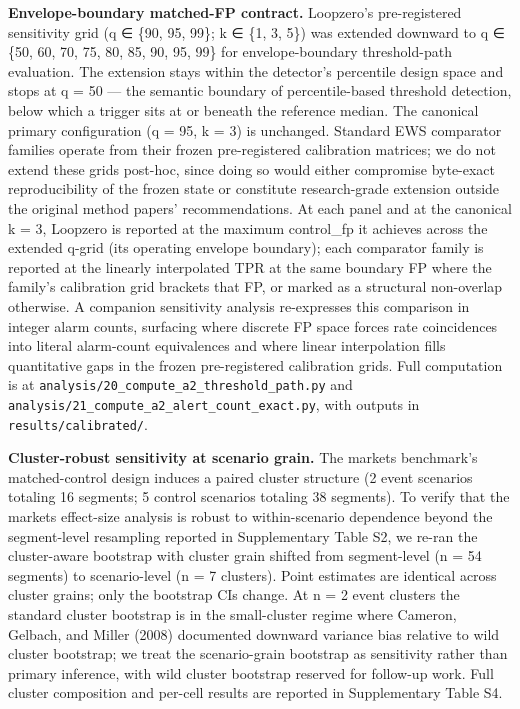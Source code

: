 \documentclass[
  11pt,
]{article}
\begin{document}
\textbf{Envelope-boundary matched-FP contract.} Loopzero's
pre-registered sensitivity grid (q ∈ \{90, 95, 99\}; k ∈ \{1, 3, 5\})
was extended downward to q ∈ \{50, 60, 70, 75, 80, 85, 90, 95, 99\} for
envelope-boundary threshold-path evaluation. The extension stays within
the detector's percentile design space and stops at q = 50 --- the
semantic boundary of percentile-based threshold detection, below which a
trigger sits at or beneath the reference median. The canonical primary
configuration (q = 95, k = 3) is unchanged. Standard EWS comparator
families operate from their frozen pre-registered calibration matrices;
we do not extend these grids post-hoc, since doing so would either
compromise byte-exact reproducibility of the frozen state or constitute
research-grade extension outside the original method papers'
recommendations. At each panel and at the canonical k = 3, Loopzero is
reported at the maximum control\_fp it achieves across the extended
q-grid (its operating envelope boundary); each comparator family is
reported at the linearly interpolated TPR at the same boundary FP where
the family's calibration grid brackets that FP, or marked as a
structural non-overlap otherwise. A companion sensitivity analysis
re-expresses this comparison in integer alarm counts, surfacing where
discrete FP space forces rate coincidences into literal alarm-count
equivalences and where linear interpolation fills quantitative gaps in
the frozen pre-registered calibration grids. Full computation is at
\texttt{analysis/20\_compute\_a2\_threshold\_path.py} and
\texttt{analysis/21\_compute\_a2\_alert\_count\_exact.py}, with outputs
in \texttt{results/calibrated/}.

\textbf{Cluster-robust sensitivity at scenario grain.} The markets
benchmark's matched-control design induces a paired cluster structure (2
event scenarios totaling 16 segments; 5 control scenarios totaling 38
segments). To verify that the markets effect-size analysis is robust to
within-scenario dependence beyond the segment-level resampling reported
in Supplementary Table S2, we re-ran the cluster-aware bootstrap with
cluster grain shifted from segment-level (n = 54 segments) to
scenario-level (n = 7 clusters). Point estimates are identical across
cluster grains; only the bootstrap CIs change. At n = 2 event clusters
the standard cluster bootstrap is in the small-cluster regime where
Cameron, Gelbach, and Miller (2008) documented downward variance bias
relative to wild cluster bootstrap; we treat the scenario-grain
bootstrap as sensitivity rather than primary inference, with wild
cluster bootstrap reserved for follow-up work. Full cluster composition
and per-cell results are reported in Supplementary Table S4.
\end{document}
